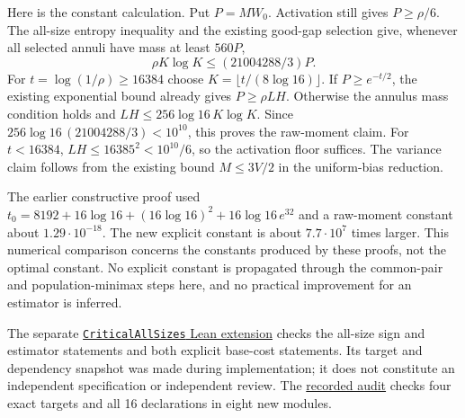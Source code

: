 Here is the constant calculation. Put $P=MW_0$. Activation still gives
$P\ge\rho/6$. The all-size entropy inequality and the existing good-gap
selection give, whenever all selected annuli have mass at least $560P$,
\[
 \rho K\log K\le(21004288/3)P.
\]
For $t=\log(1/\rho)\ge16384$ choose
$K=\lfloor t/(8\log16)\rfloor$. If $P\ge e^{-t/2}$, the existing
exponential bound already gives $P\ge\rho LH$. Otherwise the annulus
mass condition holds and $LH\le256\log16\,K\log K$.
Since $256\log16\,(21004288/3)<10^{10}$, this proves the raw-moment claim.
For $t<16384$, $LH\le16385^2<10^{10}/6$, so the activation floor suffices.
The variance claim follows from the existing bound $M\le3V/2$ in the
uniform-bias reduction.

The earlier constructive proof used
$t_0=8192+16\log16+(16\log16)^2+16\log16\,e^{32}$ and a raw-moment
constant about $1.29\cdot10^{-18}$. The new explicit constant is about
$7.7\cdot10^7$ times larger. This numerical comparison concerns the
constants produced by these proofs, not the optimal constant. No explicit
constant is propagated through the common-pair and population-minimax
steps here, and no practical improvement for an estimator is inferred.

The separate
\href{https://github.com/davidiach/adaptive-threshold-estimation/tree/ebd36676693b66814bc2a379529499428ab98650/lean/ThresholdHC/CriticalAllSizes}{\texttt{CriticalAllSizes} Lean extension}
checks the all-size
sign and estimator statements and both explicit base-cost statements.
Its target and dependency snapshot was made during implementation; it
does not constitute an independent specification or independent review.
The \href{https://github.com/davidiach/adaptive-threshold-estimation/blob/ebd36676693b66814bc2a379529499428ab98650/results/critical_all_sizes_001.json}{recorded audit}
checks four exact targets and all 16 declarations in eight new modules.
